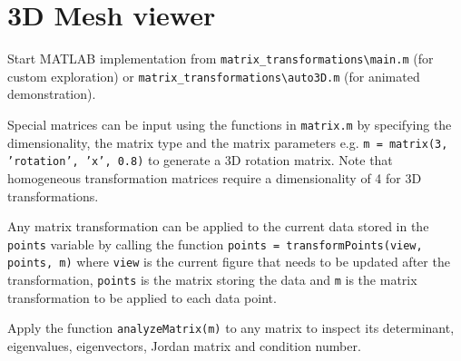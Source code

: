\documentclass{scrartcl}
\begin{document}
\section{3D Mesh viewer}
\begin{flushleft}	
	Start MATLAB implementation from \texttt{matrix\_transformations\textbackslash main.m} (for custom exploration) or \texttt{matrix\_transformations\textbackslash auto3D.m} (for animated demonstration).
	
	Special matrices can be input using the functions in \texttt{matrix.m} by specifying the dimensionality, the matrix type and the matrix parameters e.g. \texttt{m = matrix(3, 'rotation', 'x', 0.8)} to generate a 3D rotation matrix. Note that homogeneous transformation matrices require a dimensionality of 4 for 3D transformations.
	
	Any matrix transformation can be applied to the current data stored in the \texttt{points} variable by calling the function \texttt{points = transformPoints(view, points, m)} where \texttt{view} is the current figure that needs to be updated after the transformation, \texttt{points} is the matrix storing the data and \texttt{m} is the matrix transformation to be applied to each data point.
	
	Apply the function \texttt{analyzeMatrix(m)} to any matrix to inspect its determinant, eigenvalues, eigenvectors, Jordan matrix and condition number.
	
\end{flushleft}
\end{document}
